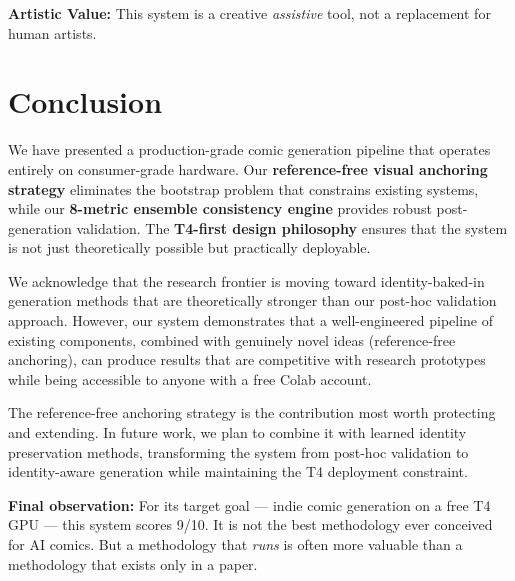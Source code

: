 \documentclass[11pt,a4paper,twocolumn]{article}
\begin{document}
\textbf{Artistic Value:} This system is a creative \textit{assistive} tool, not a replacement for human artists.

\section{Conclusion}
\label{sec:conclusion}

We have presented a production-grade comic generation pipeline that operates entirely on consumer-grade hardware. Our \textbf{reference-free visual anchoring strategy} eliminates the bootstrap problem that constrains existing systems, while our \textbf{8-metric ensemble consistency engine} provides robust post-generation validation. The \textbf{T4-first design philosophy} ensures that the system is not just theoretically possible but practically deployable.

We acknowledge that the research frontier is moving toward identity-baked-in generation methods that are theoretically stronger than our post-hoc validation approach. However, our system demonstrates that a well-engineered pipeline of existing components, combined with genuinely novel ideas (reference-free anchoring), can produce results that are competitive with research prototypes while being accessible to anyone with a free Colab account.

The reference-free anchoring strategy is the contribution most worth protecting and extending. In future work, we plan to combine it with learned identity preservation methods, transforming the system from post-hoc validation to identity-aware generation while maintaining the T4 deployment constraint.

\textbf{Final observation:} For its target goal --- indie comic generation on a free T4 GPU --- this system scores 9/10. It is not the best methodology ever conceived for AI comics. But a methodology that \textit{runs} is often more valuable than a methodology that exists only in a paper.

\end{document}
